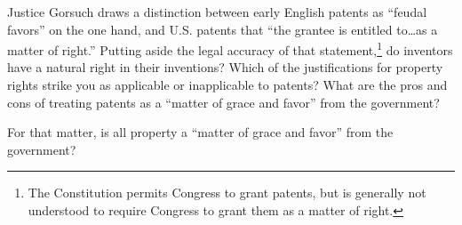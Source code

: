
\item Justice Gorsuch draws a distinction between early English patents as
``feudal favors'' on the one hand, and U.S. patents that ``the grantee is
entitled to\ldots as a matter of right.'' Putting aside the legal accuracy of
that statement,\footnote{The Constitution permits Congress
to grant patents, but is generally not understood to require Congress to grant
them as a matter of right.} do inventors have a natural right in their
inventions? Which of the justifications for property rights strike you as
applicable or inapplicable to patents? What are the pros and cons of treating
patents as a ``matter of grace and favor'' from the government?

For that matter, is all property a ``matter of grace and favor'' from the
government?

